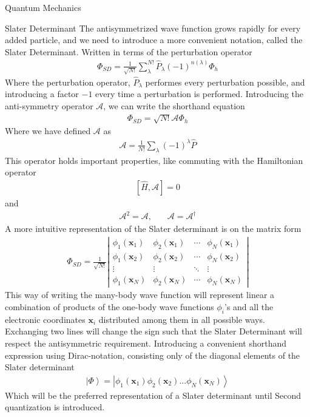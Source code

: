 \documentclass[twoside,english]{uiofysmaster}
\begin{document}
\begin{chapter}{Quantum Mechanics}
	\begin{section}{Slater Determinant}
		The antisymmetrized wave function grows rapidly for every added particle, and we need to introduce a more convenient notation, called the Slater Determinant. Written in terms of the perturbation operator \cite{Audun}
		\begin{align}
			\Phi_{SD} = \frac{1}{\sqrt{N!}} \sum_\lambda^{N!} \hat P_\lambda (-1)^{n(\lambda)} \Phi_h		 	
		\end{align} 
		Where the perturbation operator, $\hat P_{\lambda}$ performes every perturbation possible, and introducing a factor $-1$ every time a perturbation is performed. Introducing the anti-symmetry operator $\mathcal{A}$, we can write the shorthand equation
		\begin{align}
			\Phi_{SD} = \sqrt{N!}\mathcal{A}\Phi_h
		\end{align}
		Where we have defined $\mathcal{A}$ as \cite{MHJSlides}
		\begin{align}
			\mathcal{A} = \frac{1}{N!} \sum_\lambda (-1)^\lambda \hat P
		\end{align}
		This operator holds important properties, like commuting with the Hamiltonian operator
		\begin{align}
			\left[\hat H, \mathcal{A}\right] = 0
		\end{align}
		and 
		\begin{align}
			\mathcal{A}^2 = \mathcal{A}, \:\:\:\:\:\:\:\: \mathcal{A} = \mathcal{A}^\dagger
		\end{align}
		A more intuitive representation of the Slater determinant is on the matrix form 
		\begin{align}
			\Phi_{SD} = \frac{1}{ \sqrt{N!} } \left|\begin{matrix}
				\phi_1(\mathbf{x}_1) & \phi_2(\mathbf{x}_1) & \cdots & \phi_N(\mathbf{x}_1) \\
				\phi_1(\mathbf{x}_2) & \phi_2(\mathbf{x}_2) & \cdots & \phi_N(\mathbf{x}_2) \\
				\vdots & \vdots & \ddots & \vdots \\
				\phi_1(\mathbf{x}_N) & \phi_2(\mathbf{x}_N) & \cdots & \phi_N(\mathbf{x}_N) 
			\end{matrix} \right|
		\end{align}
		This way of writing the many-body wave function will represent linear a combination of products of the one-body wave functions $\phi_i$'s and all the electronic coordinates $\mathbf{x}_i$ distributed among them in all possible ways. Exchanging two lines will change the sign such that the Slater Determinant will respect the antisymmetric requirement. Introducing a convenient shorthand expression using Dirac-notation, consisting only of the diagonal elements of the Slater determinant \cite{Crawford}
		\begin{align}
			\left| \Phi \right > = \left| \phi_1(\mathbf{x}_1) \phi_2(\mathbf{x}_2) ... \phi_N({\mathbf{x}_N}) \right>  
		\end{align}
		Which will be the preferred representation of a Slater determinant until Second quantization is introduced. 
	\end{section}


\end{chapter}
\end{document}
